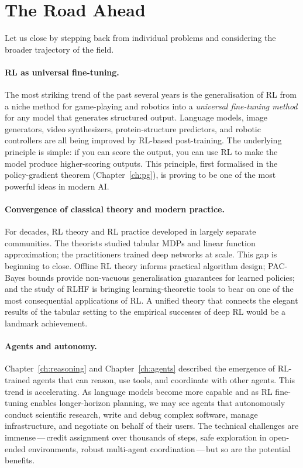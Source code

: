 \section{The Road Ahead}
\label{sec:open-road}

Let us close by stepping back from individual problems and considering
the broader trajectory of the field.

\paragraph{RL as universal fine-tuning.}
The most striking trend of the past several years is the
generalisation of RL from a niche method for game-playing and robotics
into a \emph{universal fine-tuning method} for any model that generates
structured output.  Language models, image generators, video
synthesizers, protein-structure predictors, and robotic controllers are
all being improved by RL-based post-training.  The underlying
principle is simple: if you can score the output, you can use RL to
make the model produce higher-scoring outputs.  This principle, first
formalised in the policy-gradient theorem (Chapter~\ref{ch:pg}), is
proving to be one of the most powerful ideas in modern AI.

\paragraph{Convergence of classical theory and modern practice.}
For decades, RL theory and RL practice developed in largely separate
communities.  The theorists studied tabular MDPs and linear function
approximation; the practitioners trained deep networks at scale.
This gap is beginning to close.  Offline RL theory informs practical
algorithm design; PAC-Bayes bounds provide non-vacuous generalisation
guarantees for learned policies; and the study of RLHF is bringing
learning-theoretic tools to bear on one of the most consequential
applications of RL.  A unified theory that connects the elegant
results of the tabular setting to the empirical successes of deep RL
would be a landmark achievement.

\paragraph{Agents and autonomy.}
Chapter~\ref{ch:reasoning} and Chapter~\ref{ch:agents} described
the emergence of RL-trained agents that can reason, use tools, and
coordinate with other agents.  This trend is accelerating.  As
language models become more capable and as RL fine-tuning enables
longer-horizon planning, we may see agents that autonomously conduct
scientific research, write and debug complex software, manage
infrastructure, and negotiate on behalf of their users.  The
technical challenges are immense\,---\,credit assignment over
thousands of steps, safe exploration in open-ended environments,
robust multi-agent coordination\,---\,but so are the potential
benefits.

